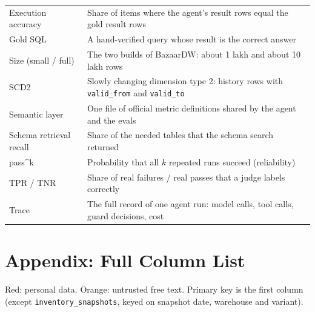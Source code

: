 \documentclass[11pt,a4paper]{article}
\newcommand{\code}[1]{\texttt{\small #1}}
\begin{document}
\begin{center}
\small
\begin{tabularx}{\linewidth}{@{}l X@{}}
\toprule
Execution accuracy & Share of items where the agent's result rows equal the gold result rows\\
Gold SQL & A hand-verified query whose result is the correct answer\\
Size (small / full) & The two builds of BazaarDW: about 1 lakh and about 10 lakh rows\\
SCD2 & Slowly changing dimension type 2: history rows with \code{valid\_from} and \code{valid\_to}\\
Semantic layer & One file of official metric definitions shared by the agent and the evals\\
Schema retrieval recall & Share of the needed tables that the schema search returned\\
pass\^{}k & Probability that all $k$ repeated runs succeed (reliability)\\
TPR / TNR & Share of real failures / real passes that a judge labels correctly\\
Trace & The full record of one agent run: model calls, tool calls, guard decisions, cost\\
\bottomrule
\end{tabularx}
\end{center}

\clearpage
\appendix
\section{Appendix: Full Column List}

\textcolor{bad}{Red}: personal data. \textcolor{warn}{Orange}: untrusted free text. Primary key
is the first column (except \code{inventory\_snapshots}, keyed on snapshot date, warehouse and variant).
\end{document}
